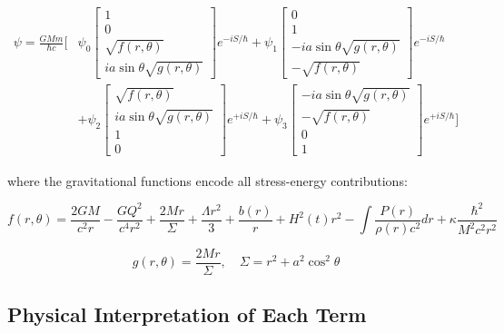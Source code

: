 \documentclass[11pt,a4paper]{article}
\theoremstyle{definition}
\theoremstyle{remark}
\begin{document}
	\begin{equation}
		\boxed{
			\begin{aligned}
				\psi = \frac{GMm}{\hbar c}\Bigg[&\psi_0 \begin{bmatrix} 1 \\ 0 \\ \sqrt{f(r,\theta)} \\ ia\sin\theta\sqrt{g(r,\theta)} \end{bmatrix} e^{-iS/\hbar} + \psi_1 \begin{bmatrix} 0 \\ 1 \\ -ia\sin\theta\sqrt{g(r,\theta)} \\ -\sqrt{f(r,\theta)} \end{bmatrix} e^{-iS/\hbar} \\[8pt]
				&+ \psi_2 \begin{bmatrix} \sqrt{f(r,\theta)} \\ ia\sin\theta\sqrt{g(r,\theta)} \\ 1 \\ 0 \end{bmatrix} e^{+iS/\hbar} + \psi_3 \begin{bmatrix} -ia\sin\theta\sqrt{g(r,\theta)} \\ -\sqrt{f(r,\theta)} \\ 0 \\ 1 \end{bmatrix} e^{+iS/\hbar}\Bigg]
			\end{aligned}
		}
		\label{eq:psi_complete}
	\end{equation}
	
	where the gravitational functions encode all stress-energy contributions:
	
	\begin{equation}
		\boxed{
			f(r,\theta) = \frac{2GM}{c^2r} - \frac{GQ^2}{c^4r^2} + \frac{2Mr}{\Sigma} + \frac{\Lambda r^2}{3} + \frac{b(r)}{r} + H^2(t)r^2 - \int\frac{P(r)}{\rho(r) c^2}dr + \kappa\frac{\hbar^2}{M^2c^2r^2}
		}
		\label{eq:f_function}
	\end{equation}
	
	\begin{equation}
		\boxed{
			g(r,\theta) = \frac{2Mr}{\Sigma}, \quad \Sigma = r^2 + a^2\cos^2\theta
		}
		\label{eq:g_function}
	\end{equation}
	
	\subsection{Physical Interpretation of Each Term}
	
\end{document}
